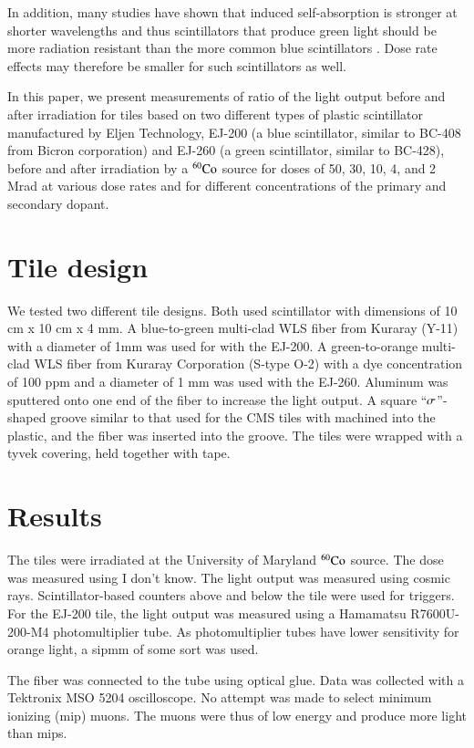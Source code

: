\documentclass[review]{elsarticle}
\begin{document}
In addition, many studies have shown that induced self-absorption is stronger 
at shorter wavelengths and thus scintillators that produce green light should
be more radiation resistant than the more common blue scintillators
\cite{Bross199135,sauli,Giokaris1993315}.  Dose rate effects may
therefore be smaller for such scintillators as well.

In this paper, we present measurements of ratio of the light output before and after irradiation
for tiles based on two different types of plastic scintillator manufactured by Eljen Technology, EJ-200 (a blue scintillator, 
similar to BC-408 from Bicron corporation) 
and 
EJ-260 (a green scintillator, similar to BC-428), before and after irradiation by a $\rm {^{60}Co}$ source for doses of 50, 30, 10, 4, and 2 Mrad at various dose rates and for different concentrations of the primary and secondary dopant.


\section{Tile design}
We tested two different tile designs.  Both used scintillator
with dimensions of 10 cm x 10 cm x 4 mm.  A blue-to-green multi-clad WLS fiber
from Kuraray (Y-11) with a diameter of 1mm was used for with the EJ-200.  A green-to-orange multi-clad WLS fiber from Kuraray Corporation 
(S-type O-2) with a dye concentration of 100 ppm and a diameter of 1 mm was used with the EJ-260.  Aluminum was sputtered onto one end of the fiber
to increase the light output.
A square ``${\rm \sigma}$''-shaped groove similar to that used for the 
CMS tiles with machined into the plastic, and the fiber was inserted
into the groove.  The tiles were wrapped with a tyvek covering, held together with tape.


\section{Results}
The tiles were irradiated at the University of Maryland
${\rm ^{60}Co}$ source.  The dose was measured using
{\color{red} I don't know.}  The light output was measured using cosmic rays.
Scintillator-based counters above and below the tile were used for triggers.
For the EJ-200 tile, the light output was measured using a Hamamatsu
R7600U-200-M4 photomultiplier tube.  As photomultiplier tubes have lower sensitivity for orange light, a {\color{red} sipmm of some sort} was used.

The fiber was connected
to the tube using optical glue.  Data was collected with a Tektronix MSO 5204 oscilloscope.  No attempt was made to select minimum ionizing (mip) muons.  The muons were thus
of low energy and produce more light than mips.
\end{document}
